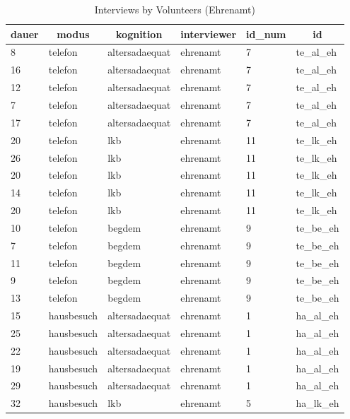 \documentclass[
  doc,floatsintext]{apa6}
\begin{document}
\begin{table}[tbp]

\begin{center}
\begin{threeparttable}

\caption{\label{tab:tabinspect3e}Interviews by Volunteers (Ehrenamt)}

\begin{tabular}{llllll}
\toprule
dauer & \multicolumn{1}{c}{modus} & \multicolumn{1}{c}{kognition} & \multicolumn{1}{c}{interviewer} & \multicolumn{1}{c}{id\_num} & \multicolumn{1}{c}{id}\\
\midrule
8 & telefon & altersadaequat & ehrenamt & 7 & te\_al\_eh\\
16 & telefon & altersadaequat & ehrenamt & 7 & te\_al\_eh\\
12 & telefon & altersadaequat & ehrenamt & 7 & te\_al\_eh\\
7 & telefon & altersadaequat & ehrenamt & 7 & te\_al\_eh\\
17 & telefon & altersadaequat & ehrenamt & 7 & te\_al\_eh\\
20 & telefon & lkb & ehrenamt & 11 & te\_lk\_eh\\
26 & telefon & lkb & ehrenamt & 11 & te\_lk\_eh\\
20 & telefon & lkb & ehrenamt & 11 & te\_lk\_eh\\
14 & telefon & lkb & ehrenamt & 11 & te\_lk\_eh\\
20 & telefon & lkb & ehrenamt & 11 & te\_lk\_eh\\
10 & telefon & begdem & ehrenamt & 9 & te\_be\_eh\\
7 & telefon & begdem & ehrenamt & 9 & te\_be\_eh\\
11 & telefon & begdem & ehrenamt & 9 & te\_be\_eh\\
9 & telefon & begdem & ehrenamt & 9 & te\_be\_eh\\
13 & telefon & begdem & ehrenamt & 9 & te\_be\_eh\\
15 & hausbesuch & altersadaequat & ehrenamt & 1 & ha\_al\_eh\\
25 & hausbesuch & altersadaequat & ehrenamt & 1 & ha\_al\_eh\\
22 & hausbesuch & altersadaequat & ehrenamt & 1 & ha\_al\_eh\\
19 & hausbesuch & altersadaequat & ehrenamt & 1 & ha\_al\_eh\\
29 & hausbesuch & altersadaequat & ehrenamt & 1 & ha\_al\_eh\\
32 & hausbesuch & lkb & ehrenamt & 5 & ha\_lk\_eh\\

\end{tabular}
\end{threeparttable}
\end{center}
\end{table}
\end{document}
